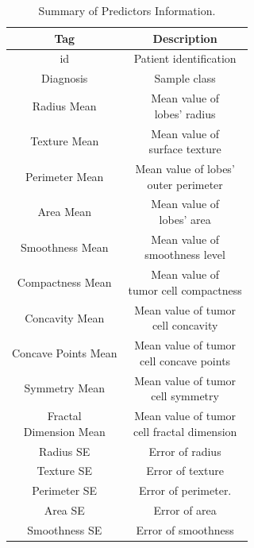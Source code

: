\documentclass[conference]{IEEEtran}
\begin{document}
\begin{table}[htbp]
\caption{Summary of Predictors Information.}
\begin{center}
\begin{tabular}{|c|c|}
    \hline
    \cline{2-2} 
    Tag & Description \\
    \hline
    id & Patient identification \\
    \hline
    Diagnosis & Sample class \\
    \hline
    Radius Mean & \makecell{Mean value of \\ lobes' radius} \\
    \hline
    Texture Mean & \makecell{Mean value of \\ surface texture} \\
    \hline
    Perimeter Mean & \makecell{Mean value of lobes' \\ outer perimeter} \\
    \hline
    Area Mean & \makecell{Mean value of \\ lobes' area} \\
    \hline
    Smoothness Mean & \makecell{Mean value of \\ smoothness level} \\
    \hline
    Compactness Mean & \makecell{Mean value of \\ tumor cell compactness} \\
    \hline
    Concavity Mean & \makecell{Mean value of tumor \\ cell concavity} \\
    \hline
    Concave Points Mean &  \makecell{Mean value of tumor\\ cell concave points} \\
    \hline
    Symmetry Mean & \makecell{Mean value of tumor\\ cell symmetry} \\
    \hline
    \makecell{Fractal \\ Dimension Mean} & \makecell{Mean value of tumor \\ cell fractal dimension} \\
    \hline
    Radius SE & Error of radius \\
    \hline
    Texture SE & Error of texture \\
    \hline
    Perimeter SE & Error of perimeter. \\
    \hline
    Area SE & Error of area \\
    \hline
    Smoothness SE & Error of smoothness \\

\end{tabular}
\end{center}
\end{table}
\end{document}
